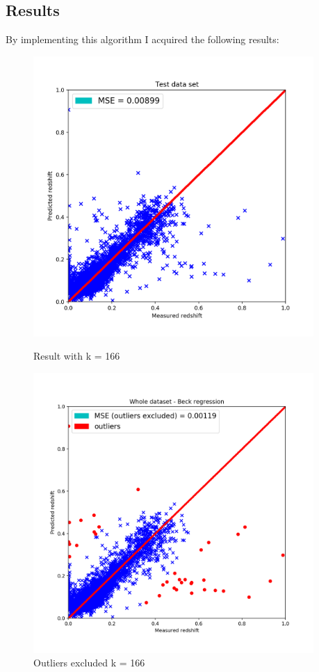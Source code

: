 \documentclass[a4paper,12pt]{article}
\begin{document}
\subsection{Results}

\par By implementing this algorithm I acquired the following results:

\begin{figure}[H]
	\centering
	\begin{minipage}{0.5\textwidth}
		\centering
		\includegraphics[width=0.95\textwidth]{./beck-default.png}
		\caption{ Result with k = 166 }
	\end{minipage}\hfill
	\begin{minipage}{0.5\textwidth}
		\centering
		\includegraphics[width=0.95\textwidth]{./beck-outliers.png}
		\caption{ Outliers excluded k = 166 }
	\end{minipage}
\end{figure}
\end{document}
